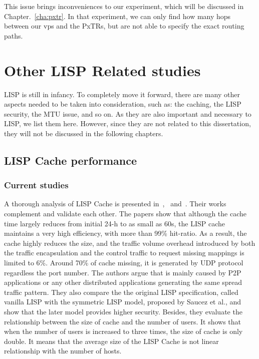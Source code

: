 This issue brings inconveniences to our experiment, which will be discussed in Chapter.~\ref{cha:pxtr}. In that experiment, we can only find how many hops between our \acrshort{vp}s and the PxTRs, but are not able to specify the exact routing paths.

\section{Other LISP Related studies}
\label{subsec:other_studies}
LISP is still in infancy. To completely move it forward, there are many other aspects needed to be taken into consideration, such as: the caching, the LISP security, the MTU issue, and so on. As they are also important and necessary to LISP, we list them here. However, since they are not related to this dissertation, they will not be discussed in the following chapters.

\subsection{LISP Cache performance}
\label{subsec:cache}

\subsubsection{Current studies}
\label{subsubsec:cache_studies}
A thorough analysis of LISP Cache is presented in~\cite{lispCacheCost},~\cite{lispCacheDive} and~\cite{kim2013caching}. Their works complement and validate each other. The papers %
show that although the cache time largely reduces from initial 24-h to as small as 60s, the LISP cache maintains a very high efficiency, with more than 99\% hit-ratio. As a result, the cache highly reduces the size, and the traffic volume overhead introduced by both the traffic encapsulation and the control traffic to request missing mappings is limited to 6\%. Around 70\% of cache missing, it is generated by UDP protocol regardless the port number. The authors argue that is mainly caused by P2P applications or any other distributed applications generating the same spread traffic pattern. They also compare the the original LISP specification, called vanilla LISP with the symmetric LISP model, proposed by Saucez et al., and show that the later model provides higher security. Besides, they evaluate the relationship between the size of cache and the number of users. It shows that when the number of users is increased to three times, the size of cache is only double. It means that the average size of the LISP Cache is not linear relationship with the number of hosts.
